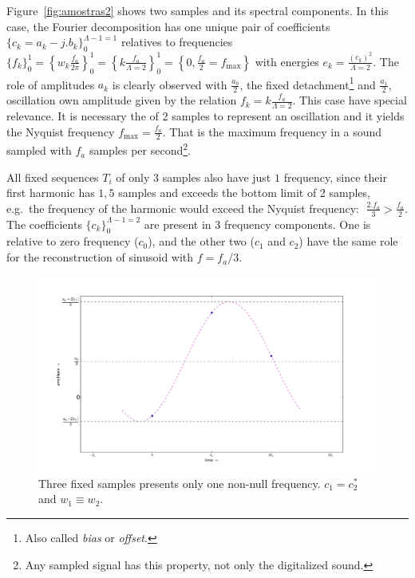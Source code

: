 \documentclass[
 aip,
 jmp,
 amsmath,amssymb,
 reprint,
]{revtex4-1}
\begin{document}
Figure~\ref{fig:amostras2} shows two samples and its spectral components. In this case, the Fourier decomposition has one unique pair of coefficients $\{c_k=a_k-j.b_k\}_0^{\Lambda-1=1}$ relatives to frequencies $\{f_k\}_0^1=\left\{w_k\frac{f_a}{2\pi}\right\}_0^1=\left\{k\frac{f_a}{\Lambda=2}\right\}_0^1=\left\{0,\frac{f_a}{2}=f_{\text{max}}\right\}$
with energies $e_k=\frac{(c_k)^2}{\Lambda=2}$. The role of amplitudes $a_k$ is clearly observed with $\frac{a_0}{2}$, the fixed detachment\footnote{Also called \emph{bias} or \emph{offset}.} and $\frac{a_1}{2}$, oscillation own amplitude given by the relation $f_k=k \frac{f_a}{\Lambda=2}$.
This case have special relevance. It is necessary the of 2 samples to represent an oscillation and it yields the Nyquist frequency $f_{\text{max}}=\frac{f_a}{2}$. That is the maximum frequency in a sound sampled with $f_a$ samples per second\footnote{Any sampled signal has this property, not only the digitalized sound.}.

All fixed sequences $T_i$ of only $3$ samples also have just $1$ frequency, since their first harmonic has $1,5$ samples and exceeds the bottom limit of 2 samples, e.g.\ the frequency of the harmonic would exceed the Nyquist frequency:  $\; \frac{2. f_a}{3} > \frac{f_a}{2} $. 
The coefficients $\{c_k\}_0^{\Lambda-1=2}$ are present in 3 frequency components. One is relative to zero frequency ($c_0$), and the other two ($c_1$ and $c_2$) have the same role for the reconstruction of sinusoid with $f=f_a/3$.

 \begin{figure}[h!]
     \centering
         \includegraphics[width=\columnwidth]{figures/amostras3b}
     \caption{Three fixed samples presents only one non-null frequency. $c_1=c_2^*$ and $w_1 \equiv w_2$.}
         \label{fig:amostras3}
 \end{figure}
\end{document}
